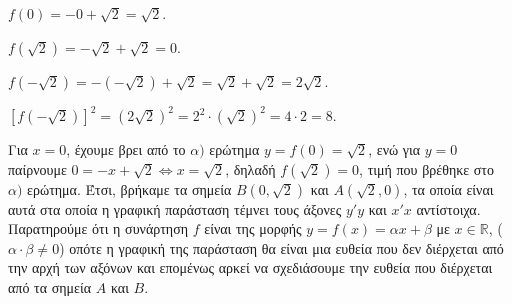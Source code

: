 
\begin{alist}
\item $f(0) = -0 + \sqrt{2} = \sqrt{2}$.

$f(\sqrt{2}) = -\sqrt{2} + \sqrt{2} = 0$.

$f(-\sqrt{2}) = -(-\sqrt{2}) + \sqrt{2} = \sqrt{2} + \sqrt{2} = 2\sqrt{2}.$

$[f(-\sqrt{2})]^2 = (2\sqrt{2})^2 = 2^2 \cdot (\sqrt{2})^2 = 4 \cdot 2 = 8.$

\item Για $x = 0$, έχουμε βρει από το $\alpha)$ ερώτημα $y = f(0) = \sqrt{2}$, ενώ για $y = 0$ παίρνουμε
$0 = -x + \sqrt{2} \Leftrightarrow x = \sqrt{2}$, δηλαδή $f(\sqrt{2}) = 0$, τιμή που βρέθηκε στο $\alpha)$ ερώτημα. Έτσι, βρήκαμε τα σημεία $B(0, \sqrt{2})$ και $A(\sqrt{2}, 0)$, τα οποία είναι αυτά στα οποία η γραφική παράσταση τέμνει τους άξονες $y'y$ και $x'x$ αντίστοιχα.
Παρατηρούμε ότι η συνάρτηση $f$ είναι της μορφής $y = f(x) = \alpha x + \beta$ με $x \in \mathbb{R}$, ($\alpha \cdot \beta \ne 0$)
οπότε η γραφική της παράσταση θα είναι μια ευθεία που δεν διέρχεται από την αρχή των
αξόνων και επομένως αρκεί να σχεδιάσουμε την ευθεία που διέρχεται από τα σημεία $A$ και $B$.
\end{alist}

